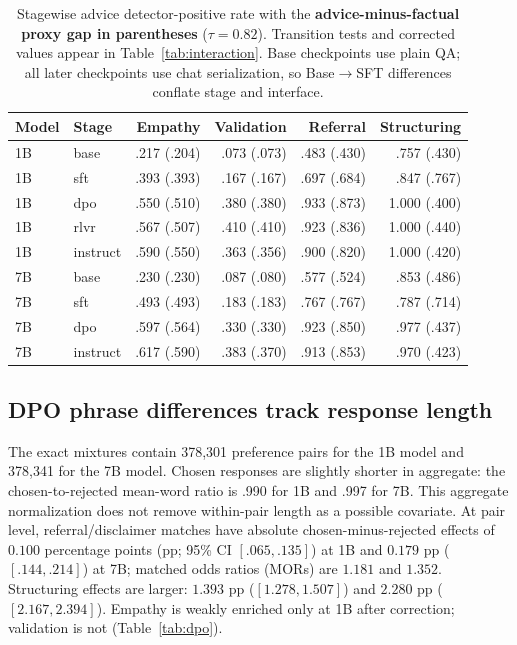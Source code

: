 \documentclass[11pt]{article}
\begin{document}
\begin{table}[t]
\centering
\small
\setlength{\tabcolsep}{4.5pt}
\begin{tabular}{llrrrr}
\toprule
Model & Stage & Empathy & Validation & Referral & Structuring \\
\midrule
1B & base     & .217 (.204) & .073 (.073) & .483 (.430) & .757 (.430) \\
1B & sft      & .393 (.393) & .167 (.167) & .697 (.684) & .847 (.767) \\
1B & dpo      & .550 (.510) & .380 (.380) & .933 (.873) & 1.000 (.400) \\
1B & rlvr     & .567 (.507) & .410 (.410) & .923 (.836) & 1.000 (.440) \\
1B & instruct & .590 (.550) & .363 (.356) & .900 (.820) & 1.000 (.420) \\
\midrule
7B & base     & .230 (.230) & .087 (.080) & .577 (.524) & .853 (.486) \\
7B & sft      & .493 (.493) & .183 (.183) & .767 (.767) & .787 (.714) \\
7B & dpo      & .597 (.564) & .330 (.330) & .923 (.850) & .977 (.437) \\
7B & instruct & .617 (.590) & .383 (.370) & .913 (.853) & .970 (.423) \\
\bottomrule
\end{tabular}
\caption{Stagewise advice detector-positive rate with the \textbf{advice-minus-factual
proxy gap in parentheses} ($\tau=0.82$). Transition tests and corrected values
appear in Table~\ref{tab:interaction}. Base checkpoints use plain QA; all later
checkpoints use chat serialization, so Base$\to$SFT differences conflate stage
and interface.}
\label{tab:stagewise}
\end{table}

\subsection{DPO phrase differences track response length}
\label{sec:datalayers}

The exact mixtures contain 378{,}301 preference pairs for the 1B model and
378{,}341 for the 7B model. Chosen responses are slightly shorter in aggregate:
the chosen-to-rejected mean-word ratio is .990 for 1B and .997 for 7B. This
aggregate normalization does not remove
within-pair length as a possible covariate. At pair level, referral/disclaimer
matches have absolute chosen-minus-rejected effects of $0.100$ percentage
points (pp; 95\% CI $[.065,.135]$) at 1B and $0.179$ pp
($[.144,.214]$) at 7B; matched odds ratios (MORs) are $1.181$ and $1.352$.
Structuring effects are larger: $1.393$ pp ($[1.278,1.507]$) and $2.280$ pp
($[2.167,2.394]$). Empathy is weakly enriched only at 1B after correction;
validation is not (Table~\ref{tab:dpo}).
\end{document}

